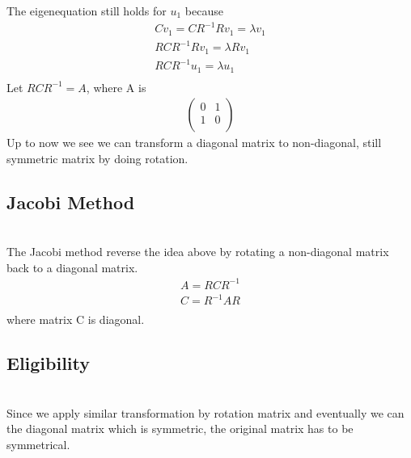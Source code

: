 \documentclass[a4paper]{article}
\begin{document}
The eigenequation still holds for $u_1$ because
\begin{align*}
	C v_1 = C R^{-1} R v_1 = \lambda v_1 \\
	R C R^{-1} R v_1 = \lambda R v_1 \\
	R C R^{-1} u_1 = \lambda  u_1 \\
\end{align*}
Let $R C R^{-1} = A $, where A is
\begin{align*}
	\left( \begin{array}{cc}	
		0 & 1\\
		1 & 0\\
\end{array} \right)
\end{align*}
Up to now we see we can transform a diagonal matrix to non-diagonal, still symmetric matrix by doing rotation. \\
\subsection{Jacobi Method}\\
The Jacobi method reverse the idea above by rotating a non-diagonal matrix back to a diagonal matrix. 
\begin{align*}
	A = R C R^{-1} \\
	C = R^{-1} A R \\
\end{align*}
where matrix C is diagonal.\\
\subsection{Eligibility}\\
Since we apply similar transformation by rotation matrix and eventually we can the diagonal matrix which is symmetric, the original matrix has to be symmetrical.\\
\end{document}
